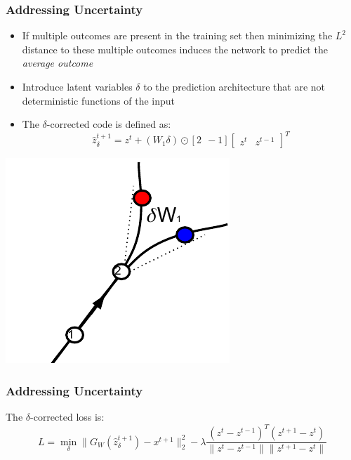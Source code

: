 \documentclass{beamer}
\begin{document}
\begin{frame} 
\frametitle{Addressing Uncertainty}
\begin{itemize}
\item If multiple outcomes are present in the training set then minimizing the $L^2$ distance to these multiple outcomes induces the network to predict the \emph{average outcome} 
\item Introduce latent variables $\delta$ to the prediction architecture that are not deterministic functions of the input
\item The $\delta$-corrected code is defined as:
\begin{equation} 
\nonumber 
\label{eqn:delta}
\hat z^{t+1}_\delta =  z^{t} + (W_1 \delta) \odot [2~~-1]\begin{bmatrix}z^t&z^{t-1}\end{bmatrix}^T
\end{equation}  
\end{itemize}
\centering
\includegraphics[scale=0.5]{./Figures/Project2/delta_ambiguity.pdf} \\
\end{frame} 

\begin{frame} 
\frametitle{Addressing Uncertainty}
The $\delta$-corrected loss is: 
\begin{equation} 
\nonumber 
\label{eqn:delta_loss}
L = \min\limits_\delta \| G_W(\hat z_\delta ^{t+1}) - x^{t+1} \|^2_2 - \lambda \frac{(z^t - z^{t-1})^T(z^{t+1} - z^t)}{\|z^t-z^{t-1}\| \|z^{t+1} - z^t\|} 
\end{equation} 
\end{frame} 
\end{document}
